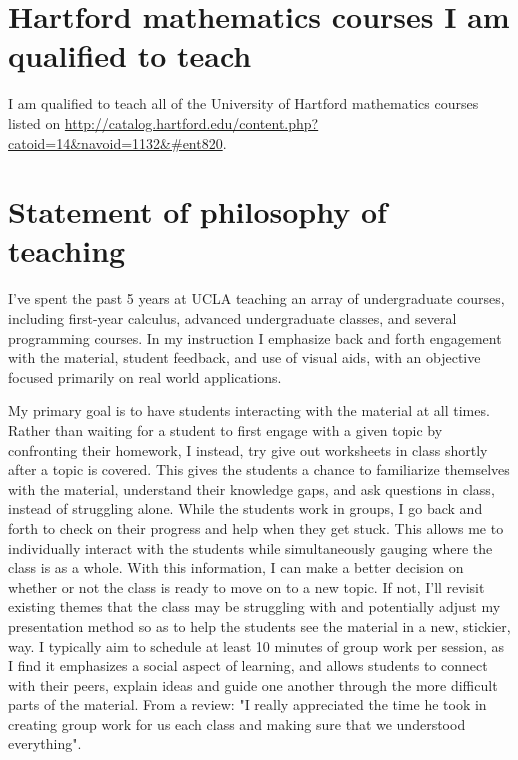 \documentclass[11pt]{article}
\begin{document}
\section*{Hartford mathematics courses I am qualified to teach}
I am qualified to teach all of the University of Hartford mathematics courses listed on \url{http://catalog.hartford.edu/content.php?catoid=14&navoid=1132&#ent820}.
\url{}

\section*{Statement of philosophy of teaching}
I've spent the past 5 years at UCLA teaching an array of undergraduate courses, including first-year calculus, advanced undergraduate classes, and several programming courses.  In my instruction I emphasize back and forth engagement with the material, student feedback, and use of visual aids, with an objective focused primarily on real world applications.  

My primary goal is to have students interacting with the material at all times.
Rather than waiting for a student to first engage with a given topic by confronting their homework,
I instead, try give out worksheets in class shortly after a topic is covered. This gives the students a chance to familiarize themselves with the material, understand their knowledge gaps, and ask questions in class, instead of struggling alone.
While the students work in groups, I go back and forth to check on their progress and help when they get stuck.
This allows me to individually interact with the students while simultaneously gauging where the class is as a whole.
With this information, I can make a better decision on whether or not the class is ready to move on to a new topic.
If not, I'll revisit existing themes that the class may be struggling with and potentially adjust my presentation method so as to help the students see the material in a new, stickier, way.  
I typically aim to schedule at least 10 minutes of group work per session, as I find it emphasizes a social aspect of learning, and allows students to connect with their peers, explain ideas and guide one another through the more difficult parts of the material.
From a review: "I really appreciated the time he took in creating group work for us each class and making sure that we understood everything".
\end{document}
